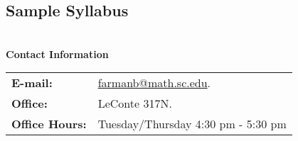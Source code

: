\documentclass[teaching.portfolio.tex]{subfiles}
\begin{document}
%
%
%
%
%
%

\subsection{Sample Syllabus}\hfill\\
\noindent
\textbf{Contact Information}\\
\noindent
\begin{tabular}{p{.9in}p{5in}}
  \textbf{E-mail:} &\href{mailto:farmanb@math.sc.edu}{farmanb@math.sc.edu}.\\
  \textbf{Office:} & LeConte 317N.\\
  \textbf{Office Hours:} & Tuesday/Thursday 4:30 pm - 5:30 pm
\end{tabular}
\end{document}
